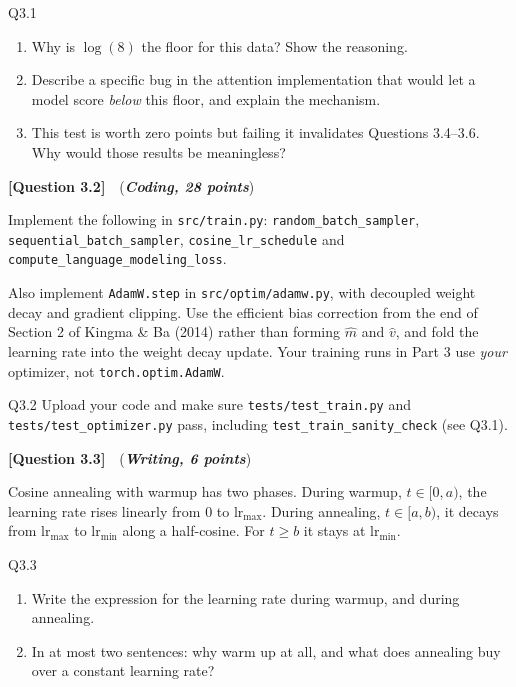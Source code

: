 \documentclass[11pt]{article}
\newcommand{\question}[3]{%
  \vspace{0.9em}
  \noindent\textbf{[Question #1]}\ \ (\textit{\textbf{#2, #3 points}})\quad
}
\begin{document}
\begin{deliverables}{Q3.1}
\begin{enumerate}[label=\Alph*., leftmargin=1.6em]
  \item Why is $\log(8)$ the floor for this data? Show the reasoning.
  \item Describe a specific bug in the attention implementation that would let a model score
    \emph{below} this floor, and explain the mechanism.
  \item This test is worth zero points but failing it invalidates Questions 3.4--3.6. Why would
    those results be meaningless?
\end{enumerate}
\end{deliverables}

\question{3.2}{Coding}{28}
Implement the following in \texttt{src/train.py}:
\texttt{random\_batch\_sampler}, \texttt{sequential\_batch\_sampler}, \texttt{cosine\_lr\_schedule}
and \texttt{compute\_language\_modeling\_loss}.

Also implement \texttt{AdamW.step} in \texttt{src/optim/adamw.py}, with decoupled weight decay and
gradient clipping. Use the efficient bias correction from the end of Section 2 of Kingma \& Ba
(2014) rather than forming $\hat{m}$ and $\hat{v}$, and fold the learning rate into the weight decay
update. Your training runs in Part 3 use \emph{your} optimizer, not \texttt{torch.optim.AdamW}.

\begin{deliverables}{Q3.2}
Upload your code and make sure \texttt{tests/test\_train.py} and
\texttt{tests/test\_optimizer.py} pass, including \texttt{test\_train\_sanity\_check} (see Q3.1).
\end{deliverables}

\question{3.3}{Writing}{6}
Cosine annealing with warmup has two phases. During warmup, $t \in [0, a)$, the learning rate rises
linearly from $0$ to $\mathrm{lr}_{\max}$. During annealing, $t \in [a, b)$, it decays from
$\mathrm{lr}_{\max}$ to $\mathrm{lr}_{\min}$ along a half-cosine. For $t \geq b$ it stays at
$\mathrm{lr}_{\min}$.

\begin{deliverables}{Q3.3}
\begin{enumerate}[label=\Alph*., leftmargin=1.6em]
  \item Write the expression for the learning rate during warmup, and during annealing.
  \item In at most two sentences: why warm up at all, and what does annealing buy over a constant
    learning rate?
\end{enumerate}
\end{deliverables}
\end{document}
